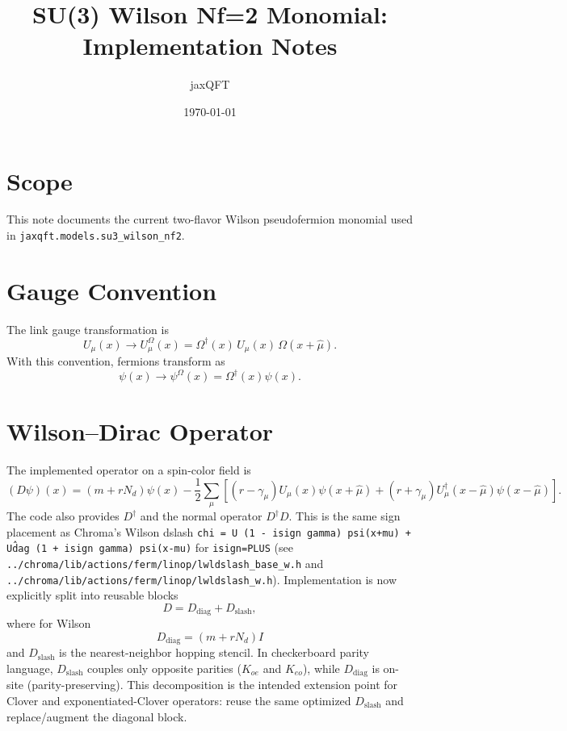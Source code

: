 \documentclass[11pt]{article}
\title{SU(3) Wilson Nf=2 Monomial: Implementation Notes}
\author{jaxQFT}
\date{\today}
\begin{document}
\maketitle

\section{Scope}
This note documents the current two-flavor Wilson pseudofermion monomial used in
\texttt{jaxqft.models.su3\_wilson\_nf2}.

\section{Gauge Convention}
The link gauge transformation is
\begin{equation}
U_\mu(x) \to U_\mu^{\Omega}(x)=\Omega^\dagger(x)\,U_\mu(x)\,\Omega(x+\hat\mu).
\end{equation}
With this convention, fermions transform as
\begin{equation}
\psi(x) \to \psi^{\Omega}(x)=\Omega^\dagger(x)\psi(x).
\end{equation}

\section{Wilson--Dirac Operator}
The implemented operator on a spin-color field is
\begin{equation}
(D\psi)(x)=\left(m+rN_d\right)\psi(x)
-\frac{1}{2}\sum_\mu\left[(r-\gamma_\mu)U_\mu(x)\psi(x+\hat\mu)
+(r+\gamma_\mu)U_\mu^\dagger(x-\hat\mu)\psi(x-\hat\mu)\right].
\end{equation}
The code also provides $D^\dagger$ and the normal operator $D^\dagger D$.
This is the same sign placement as Chroma's Wilson dslash
\texttt{chi = U (1 - isign gamma) psi(x+mu) + U\^dag (1 + isign gamma) psi(x-mu)}
for \texttt{isign=PLUS} (see
\texttt{../chroma/lib/actions/ferm/linop/lwldslash\_base\_w.h} and
\texttt{../chroma/lib/actions/ferm/linop/lwldslash\_w.h}).
Implementation is now explicitly split into reusable blocks
\begin{equation}
D = D_{\mathrm{diag}} + D_{\mathrm{slash}},
\end{equation}
where for Wilson
\begin{equation}
D_{\mathrm{diag}}=(m+rN_d)I
\end{equation}
and $D_{\mathrm{slash}}$ is the nearest-neighbor hopping stencil.
In checkerboard parity language, $D_{\mathrm{slash}}$ couples only opposite parities
($K_{oe}$ and $K_{eo}$), while $D_{\mathrm{diag}}$ is on-site (parity-preserving).
This decomposition is the intended extension point for Clover and exponentiated-Clover operators:
reuse the same optimized $D_{\mathrm{slash}}$ and replace/augment the diagonal block.
\end{document}
